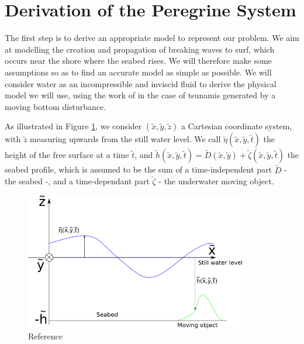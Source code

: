\documentclass[11pt,a4paper]{article}
\begin{document}
	\pagebreak
		
\section{Derivation of the Peregrine System}\label{Part1}
	The first step is to derive an appropriate model to represent our problem. We aim at modelling the creation and propagation of breaking waves to surf, which occurs near the shore where the seabed rises. We will therefore make some assumptions so as to find an accurate model as simple as possible. We will consider water as an incompressible and inviscid fluid to derive the physical model we will use, using the work of \cite{DM2013} in the case of tsunamis generated by a moving bottom disturbance.
	
	As illustrated in Figure \ref{Coordinates}, we consider $(\tilde{x},\tilde{y},\tilde{z})$ a Cartesian coordinate system, with $\tilde{z}$ measuring upwards from the still water level. We call $\tilde{\eta}(\tilde{x},\tilde{y},\tilde{t})$ the height of the free surface at a time $\tilde{t}$, and $\tilde{h}(\tilde{x},\tilde{y},\tilde{t}) = \tilde{D}(\tilde{x},\tilde{y}) + \tilde{\zeta}(\tilde{x},\tilde{y}, \tilde{t})$ the seabed profile, which is assumed to be the sum of a time-independent part $\tilde{D}$ - the seabed -, and a time-dependant part $\tilde{\zeta}$ - the underwater moving object.
	\begin{figure}[h]
		\centering
		\includegraphics[height=6cm]{CartesianCoordinates.png}
		\caption{Reference}
		\label{Coordinates}
	\end{figure}
			
\end{document}
